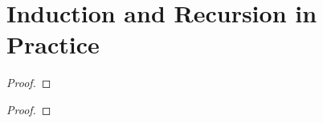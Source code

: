 \section{Induction and Recursion in Practice}
\label{irp}


\addtocounter{theorem}{3}
\begin{theorem} %
	\label{irp:t:ind}
	\TBD
\end{theorem}


\addtocounter{exercise}{12}
\Newpage
\begin{exercise} %
	\label{irp:e:13}
	\TBD
\end{exercise}

\begin{proof}
	\TBD
\end{proof}


\addtocounter{exercise}{1}
\Newpage
\begin{exercise} %
	\label{irp:e:15}
	\TBD
\end{exercise}

\begin{proof}
	\TBD
\end{proof}